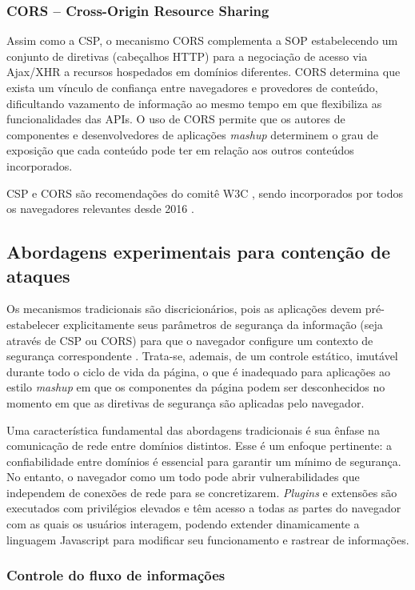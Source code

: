 \subsubsection{CORS -- Cross-Origin Resource Sharing}
Assim como a CSP, o mecanismo CORS \cite{W3C:CORS} complementa a SOP estabelecendo um conjunto de diretivas (cabeçalhos HTTP) para a negociação de acesso via Ajax/XHR a recursos hospedados em domínios diferentes. CORS determina que exista um vínculo de confiança entre navegadores e provedores de conteúdo, dificultando vazamento de informação ao mesmo tempo em que flexibiliza as funcionalidades das APIs. O uso de CORS permite que os autores de componentes e desenvolvedores de aplicações \textit{mashup} determinem o grau de exposição que cada conteúdo pode ter em relação aos outros conteúdos incorporados.

CSP e CORS são recomendações do comitê W3C \cite{W3C:CSP} \cite{W3C:CORS}, sendo incorporados por todos os navegadores relevantes desde 2016 \cite{CanIUse:CSP} \cite{CanIUse:CORS}.


\subsection{Abordagens experimentais para contenção de ataques}
Os mecanismos tradicionais são discricionários, pois as aplicações devem pré-estabelecer explicitamente seus parâmetros de segurança da informação (seja através de CSP ou CORS) para que o navegador configure um contexto de segurança correspondente \cite[p. 31]{stefan:2015:phdthesis}. Trata-se, ademais, de um controle estático, imutável durante todo o ciclo de vida da página, o que é inadequado para aplicações ao estilo \textit{mashup} em que os componentes da página podem ser desconhecidos no momento em que as diretivas de segurança são aplicadas pelo navegador.

Uma característica fundamental das abordagens tradicionais é sua ênfase na comunicação de rede entre domínios distintos. Esse é um enfoque pertinente: a confiabilidade entre domínios é essencial para garantir um mínimo de segurança. No entanto, o navegador como um todo pode abrir vulnerabilidades que independem de conexões de rede para se concretizarem. \textit{Plugins} e extensões são executados com privilégios elevados e têm acesso a todas as partes do navegador com as quais os usuários interagem, podendo extender dinamicamente a linguagem Javascript para modificar seu funcionamento e rastrear de informações.

\subsubsection{Controle do fluxo de informações}

